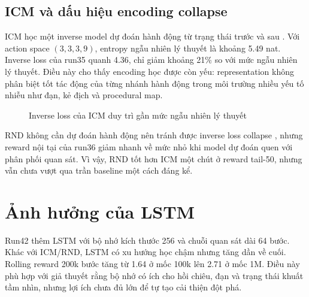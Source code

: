 \subsection{ICM và dấu hiệu encoding collapse}

ICM học một inverse model dự đoán hành động từ trạng thái trước và sau \cite{Pathak2017}. Với action space $(3,3,3,9)$, entropy ngẫu nhiên lý thuyết là khoảng 5.49 nat. Inverse loss của run35 quanh 4.36, chỉ giảm khoảng 21\% so với mức ngẫu nhiên lý thuyết. Điều này cho thấy encoding học được còn yếu: representation không phân biệt tốt tác động của từng nhánh hành động trong môi trường nhiều yếu tố nhiễu như đạn, kẻ địch và procedural map.

\begin{figure}[H]
    \centering
    \caption{Inverse loss của ICM duy trì gần mức ngẫu nhiên lý thuyết}
    \label{fig:icm_inverse_plateau}
\end{figure}

RND không cần dự đoán hành động nên tránh được inverse loss collapse \cite{Burda2018}, nhưng reward nội tại của run36 giảm nhanh về mức nhỏ khi model dự đoán quen với phân phối quan sát. Vì vậy, RND tốt hơn ICM một chút ở reward tail-50, nhưng vẫn chưa vượt qua trần baseline một cách đáng kể.

\section{Ảnh hưởng của LSTM}

Run42 thêm LSTM với bộ nhớ kích thước 256 và chuỗi quan sát dài 64 bước. Khác với ICM/RND, LSTM có xu hướng học chậm nhưng tăng dần về cuối. Rolling reward 200k bước tăng từ 1.64 ở mốc 100k lên 2.71 ở mốc 1M. Điều này phù hợp với giả thuyết rằng bộ nhớ có ích cho hồi chiêu, đạn và trạng thái khuất tầm nhìn, nhưng lợi ích chưa đủ lớn để tự tạo cải thiện đột phá.

